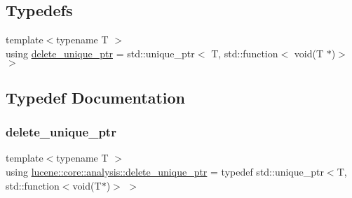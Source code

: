 \subsection*{Typedefs}
\begin{DoxyCompactItemize}
\item 
{\footnotesize template$<$typename T $>$ }\\using \mbox{\hyperlink{namespacelucene_1_1core_1_1analysis_a1ecb3e92b19c3afd8060d81a437a7a3b}{delete\+\_\+unique\+\_\+ptr}} = std\+::unique\+\_\+ptr$<$ T, std\+::function$<$ void(T $\ast$)$>$ $>$
\end{DoxyCompactItemize}


\subsection{Typedef Documentation}
\mbox{\label{namespacelucene_1_1core_1_1analysis_a1ecb3e92b19c3afd8060d81a437a7a3b}} 
\subsubsection{\texorpdfstring{delete\+\_\+unique\+\_\+ptr}{delete\_unique\_ptr}}
{\footnotesize\ttfamily template$<$typename T $>$ \\
using \mbox{\hyperlink{namespacelucene_1_1core_1_1analysis_a1ecb3e92b19c3afd8060d81a437a7a3b}{lucene\+::core\+::analysis\+::delete\+\_\+unique\+\_\+ptr}} = typedef std\+::unique\+\_\+ptr$<$T, std\+::function$<$void(T$\ast$)$>$ $>$}

